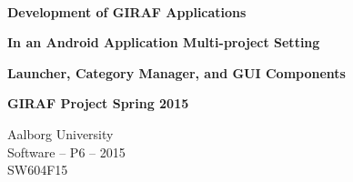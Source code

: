 
\begin{center}

	\vspace*{\fill}

	\hrulefill\newline \\

	\begin{huge}	
		\textbf{Development of GIRAF Applications}
	\end{huge}

	\vspace{0.6cm}

	\begin{Large}
		\textbf{In an Android Application Multi-project Setting}
	\end{Large}

	\vspace{0.6cm}

	\begin{large}
		\textbf{Launcher, Category Manager, and GUI Components}
	\end{large}

	\vspace{1cm}

	\begin{large} 
		\textbf{GIRAF Project Spring 2015}
	\end{large}

	\hrulefill\newline

	Aalborg University		\\
	Software -- P6 -- 2015	\\
	SW604F15				\\
    
	\vspace*{\fill}

\end{center}
\thispagestyle{empty}